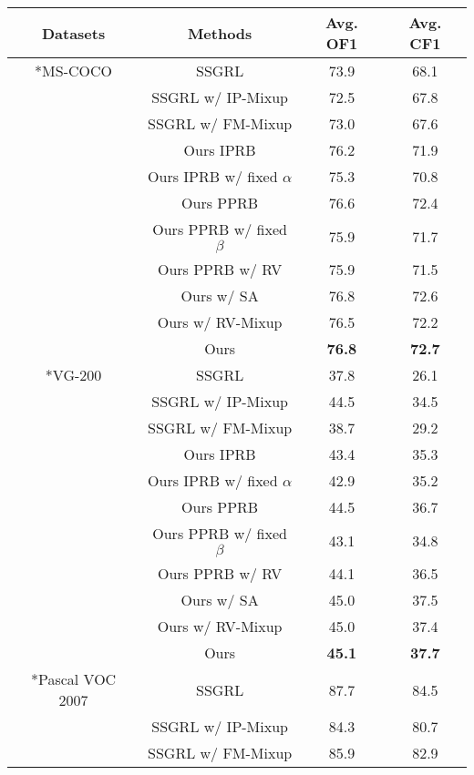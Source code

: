 \documentclass[lettersize,journal]{IEEEtran}
\begin{document}
\begin{table}[!t]
  \centering
  \begin{tabular}{c|c|cc}
  \hline
  \centering Datasets & Methods & Avg. OF1 & Avg. CF1 \\
  \hline
  \hline
  \centering \multirow{10}*{MS-COCO} & SSGRL & 73.9 & 68.1 \\
  \centering ~ & SSGRL w/ IP-Mixup & 72.5 & 67.8 \\
  \centering ~ & SSGRL w/ FM-Mixup & 73.0 & 67.6 \\
  \centering ~ & Ours IPRB & 76.2 & 71.9 \\
  \centering ~ & Ours IPRB w/ fixed $\alpha$ & 75.3 & 70.8 \\
  \centering ~ & Ours PPRB & 76.6 & 72.4 \\
  \centering ~ & Ours PPRB w/ fixed $\beta$ & 75.9 & 71.7 \\
  \centering ~ & Ours PPRB w/ RV & 75.9 & 71.5 \\
  \centering ~ & Ours w/ SA & 76.8 & 72.6 \\
  \centering ~ & Ours w/ RV-Mixup & 76.5 & 72.2 \\
  \centering ~ & Ours & \textbf{76.8} & \textbf{72.7} \\
  \hline
  \hline
  \centering \multirow{10}*{VG-200} & SSGRL & 37.8 & 26.1 \\
  \centering ~ & SSGRL w/ IP-Mixup & 44.5 & 34.5 \\
  \centering ~ & SSGRL w/ FM-Mixup & 38.7 & 29.2 \\
  \centering ~ & Ours IPRB & 43.4 & 35.3 \\
  \centering ~ & Ours IPRB w/ fixed $\alpha$ & 42.9 & 35.2 \\
  \centering ~ & Ours PPRB & 44.5 & 36.7 \\
  \centering ~ & Ours PPRB w/ fixed $\beta$ & 43.1 & 34.8 \\
  \centering ~ & Ours PPRB w/ RV & 44.1 & 36.5 \\
  \centering ~ & Ours w/ SA & 45.0 & 37.5 \\
  \centering ~ & Ours w/ RV-Mixup & 45.0 & 37.4 \\
  \centering ~ & Ours & \textbf{45.1} & \textbf{37.7} \\
  \hline
  \hline
  \centering \multirow{10}*{Pascal VOC 2007} & SSGRL & 87.7 & 84.5 \\
  \centering ~ & SSGRL w/ IP-Mixup & 84.3 & 80.7 \\
  \centering ~ & SSGRL w/ FM-Mixup & 85.9 & 82.9 \\

\end{tabular}
\end{table}
\end{document}

